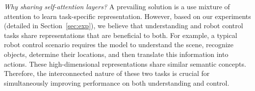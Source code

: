 \textit{Why sharing self-attention layers?} A prevailing solution is a use mixture of attention to learn task-specific representation. However, based on our experiments (detailed in Section~\ref{sec:exp}), we believe that understanding and robot control tasks share representations that are beneficial to both. For example, a typical robot control scenario requires the model to understand the scene, recognize objects, determine their locations, and then translate this information into actions.  These high-dimensional representations share similar semantic concepts. Therefore, the interconnected nature of these two tasks is crucial for simultaneously improving performance on both understanding and control.









